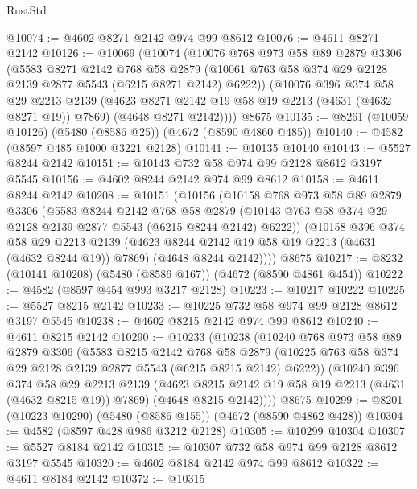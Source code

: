 \begin{lexlean}{RustStd}
\begin{coremodule}
{\begin{coremodule}
{{{{{{{{{{{{{{{{@10074 := @4602 @8271 @2142 @974 @99 @8612
@10076 := @4611 @8271 @2142
@10126 := @10069
    (@10074
      (@10076
        @768
        @973
        @58
        @89
        @2879
        @3306
        (@5583
          @8271
          @2142
          @768
          @58
          @2879
          (@10061 @763 @58 @374 @29 @2128 @2139 @2877 @5543 (@6215 @8271 @2142) @6222))
        (@10076
          @396
          @374
          @58
          @29
          @2213
          @2139
          (@4623 @8271 @2142 @19 @58 @19 @2213 (@4631 (@4632 @8271 @19)) @7869)
          (@4648 @8271 @2142))))
    @8675
@10135 := @8261 (@10059 @10126) (@5480 (@8586 @25)) (@4672 (@8590 @4860 @485))
@10140 := @4582 (@8597 @485 @1000 @3221 @2128)
@10141 := @10135 @10140
@10143 := @5527 @8244 @2142
@10151 := @10143 @732 @58 @974 @99 @2128 @8612 @3197 @5545
@10156 := @4602 @8244 @2142 @974 @99 @8612
@10158 := @4611 @8244 @2142
@10208 := @10151
    (@10156
      (@10158
        @768
        @973
        @58
        @89
        @2879
        @3306
        (@5583
          @8244
          @2142
          @768
          @58
          @2879
          (@10143 @763 @58 @374 @29 @2128 @2139 @2877 @5543 (@6215 @8244 @2142) @6222))
        (@10158
          @396
          @374
          @58
          @29
          @2213
          @2139
          (@4623 @8244 @2142 @19 @58 @19 @2213 (@4631 (@4632 @8244 @19)) @7869)
          (@4648 @8244 @2142))))
    @8675
@10217 := @8232 (@10141 @10208) (@5480 (@8586 @167)) (@4672 (@8590 @4861 @454))
@10222 := @4582 (@8597 @454 @993 @3217 @2128)
@10223 := @10217 @10222
@10225 := @5527 @8215 @2142
@10233 := @10225 @732 @58 @974 @99 @2128 @8612 @3197 @5545
@10238 := @4602 @8215 @2142 @974 @99 @8612
@10240 := @4611 @8215 @2142
@10290 := @10233
    (@10238
      (@10240
        @768
        @973
        @58
        @89
        @2879
        @3306
        (@5583
          @8215
          @2142
          @768
          @58
          @2879
          (@10225 @763 @58 @374 @29 @2128 @2139 @2877 @5543 (@6215 @8215 @2142) @6222))
        (@10240
          @396
          @374
          @58
          @29
          @2213
          @2139
          (@4623 @8215 @2142 @19 @58 @19 @2213 (@4631 (@4632 @8215 @19)) @7869)
          (@4648 @8215 @2142))))
    @8675
@10299 := @8201 (@10223 @10290) (@5480 (@8586 @155)) (@4672 (@8590 @4862 @428))
@10304 := @4582 (@8597 @428 @986 @3212 @2128)
@10305 := @10299 @10304
@10307 := @5527 @8184 @2142
@10315 := @10307 @732 @58 @974 @99 @2128 @8612 @3197 @5545
@10320 := @4602 @8184 @2142 @974 @99 @8612
@10322 := @4611 @8184 @2142
@10372 := @10315
}}}}}}}}}}}}}}}}
\end{coremodule}}
\end{coremodule}
\end{lexlean}

